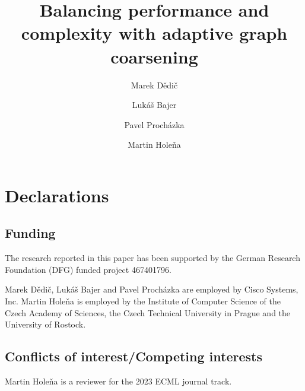 \documentclass[runningheads]{llncs}
\begin{document}
\title{Balancing performance and complexity with adaptive graph coarsening}


\author{
	Marek Dědič \and
	Lukáš Bajer \and
	Pavel Procházka \and
	Martin Holeňa
}


\maketitle











\section*{Declarations}

\subsection*{Funding}

The research reported in this paper has been supported by the German Research Foundation (DFG) funded project 467401796.

Marek Dědič, Lukáš Bajer and Pavel Procházka are employed by Cisco Systems, Inc. Martin Holeňa is employed by the Institute of Computer Science of the Czech Academy of Sciences, the Czech Technical University in Prague and the University of Rostock.

\subsection*{Conflicts of interest/Competing interests}

Martin Holeňa is a reviewer for the 2023 ECML journal track.
\end{document}
